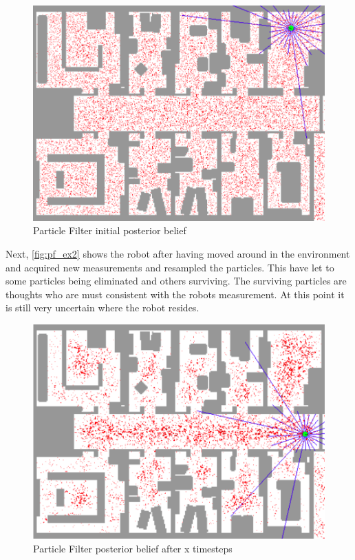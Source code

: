 \begin{figure}[H]
\centering
\includegraphics[scale=0.45]{images/particlefilter1}
\caption{Particle Filter initial posterior belief}
\label{fig:pf_ex1}
\end{figure}

Next, \autoref{fig:pf_ex2} shows the robot after having moved around in the environment and acquired new measurements and resampled the particles. This have let to some particles being eliminated and others surviving. The surviving particles are thoughts who are must consistent with the robots measurement. At this point it is still very uncertain where the robot resides.

\begin{figure}[H]
\centering
\includegraphics[scale=0.45]{images/particlefilter2}
\caption{Particle Filter posterior belief after x timesteps}
\label{fig:pf_ex2}
\end{figure}

